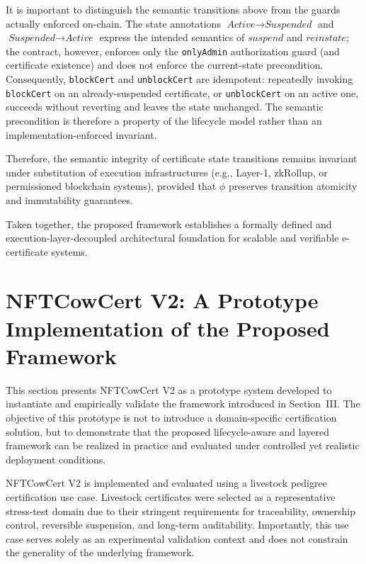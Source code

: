 \documentclass[pdflatex,sn-mathphys-num]{sn-jnl}
\begin{document}
It is important to distinguish the semantic transitions above from the guards actually enforced on-chain. The state annotations $\textit{Active} \rightarrow \textit{Suspended}$ and $\textit{Suspended} \rightarrow \textit{Active}$ express the intended semantics of $\textit{suspend}$ and $\textit{reinstate}$; the contract, however, enforces only the \texttt{onlyAdmin} authorization guard (and certificate existence) and does not enforce the current-state precondition. Consequently, \texttt{blockCert} and \texttt{unblockCert} are idempotent: repeatedly invoking \texttt{blockCert} on an already-suspended certificate, or \texttt{unblockCert} on an active one, succeeds without reverting and leaves the state unchanged. The semantic precondition is therefore a property of the lifecycle model rather than an implementation-enforced invariant.

Therefore, the semantic integrity of certificate state transitions remains invariant under substitution of execution infrastructures (e.g., Layer-1, zkRollup, or permissioned blockchain systems), provided that $\phi$ preserves transition atomicity and immutability guarantees.

Taken together, the proposed framework establishes a formally defined and execution-layer-decoupled architectural foundation for scalable and verifiable e-certificate systems.

\section{NFTCowCert V2: A Prototype Implementation of the Proposed Framework}

This section presents NFTCowCert V2 as a prototype system developed to instantiate and empirically validate the framework introduced in Section~III. The objective of this prototype is not to introduce a domain-specific certification solution, but to demonstrate that the proposed lifecycle-aware and layered framework can be realized in practice and evaluated under controlled yet realistic deployment conditions.

NFTCowCert V2 is implemented and evaluated using a livestock pedigree certification use case. Livestock certificates were selected as a representative stress-test domain due to their stringent requirements for traceability, ownership control, reversible suspension, and long-term auditability. Importantly, this use case serves solely as an experimental validation context and does not constrain the generality of the underlying framework.
\end{document}
